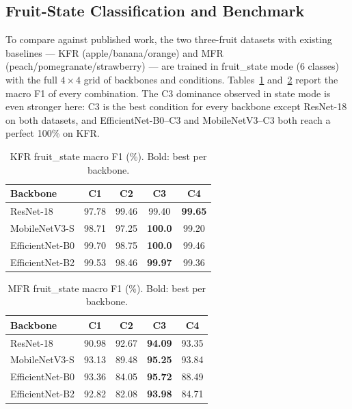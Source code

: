 \documentclass[conference]{IEEEtran}
\begin{document}
\subsection{Fruit-State Classification and Benchmark}
\label{sec:bench}

To compare against published work, the two three-fruit datasets with
existing baselines --- KFR (apple/banana/orange) and MFR
(peach/pomegranate/strawberry) --- are trained in fruit\_state mode
(6 classes) with the full $4\times4$ grid of backbones and conditions.
Tables~\ref{tab:kfrfs} and~\ref{tab:mfrfs} report the macro F1 of every
combination.
The C3 dominance observed in state mode is even stronger here: C3 is the
best condition for every backbone except ResNet-18 on both datasets, and
EfficientNet-B0--C3 and MobileNetV3--C3 both reach a perfect 100\% on KFR.

\begin{table}[h]
\centering
\caption{KFR fruit\_state macro F1 (\%). Bold: best per backbone.}
\label{tab:kfrfs}
\setlength{\tabcolsep}{5pt}
\begin{tabular}{lcccc}
\toprule
\textbf{Backbone} & \textbf{C1} & \textbf{C2} & \textbf{C3} & \textbf{C4} \\
\midrule
ResNet-18       & 97.78 & 99.46 & 99.40 & \textbf{99.65} \\
MobileNetV3-S   & 98.71 & 97.25 & \textbf{100.0} & 99.20 \\
EfficientNet-B0 & 99.70 & 98.75 & \textbf{100.0} & 99.46 \\
EfficientNet-B2 & 99.53 & 98.46 & \textbf{99.97} & 99.36 \\
\bottomrule
\end{tabular}
\end{table}

\begin{table}[h]
\centering
\caption{MFR fruit\_state macro F1 (\%). Bold: best per backbone.}
\label{tab:mfrfs}
\setlength{\tabcolsep}{5pt}
\begin{tabular}{lcccc}
\toprule
\textbf{Backbone} & \textbf{C1} & \textbf{C2} & \textbf{C3} & \textbf{C4} \\
\midrule
ResNet-18       & 90.98 & 92.67 & \textbf{94.09} & 93.35 \\
MobileNetV3-S   & 93.13 & 89.48 & \textbf{95.25} & 93.84 \\
EfficientNet-B0 & 93.36 & 84.05 & \textbf{95.72} & 88.49 \\
EfficientNet-B2 & 92.82 & 82.08 & \textbf{93.98} & 84.71 \\
\bottomrule
\end{tabular}
\end{table}
\end{document}
